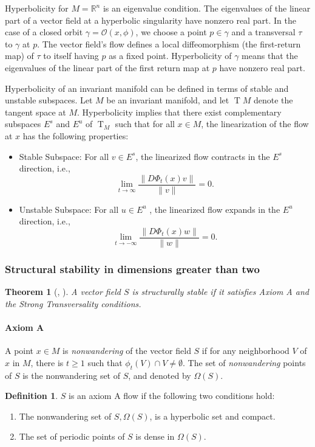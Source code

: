 \documentclass{article}
\newtheorem{theorem}{Theorem}
\theoremstyle{definition} \newtheorem{definition}{Definition}
\theoremstyle{remark} \newtheorem{remark}{Remark}
\newcommand{\reals}{\mathbb{R}}
\newcommand{\T}{\operatorname{T}}
\newcommand{\TM}{\T\!M}
\newcounter{ct}
\begin{document}
Hyperbolicity for $M=\reals^n$ is an eigenvalue condition.
The eigenvalues of the linear part of a vector field at a hyperbolic singularity have nonzero real part.
In the case of a closed orbit $\gamma=\mathcal{O}(x,\phi)$, we choose a point $p\in\gamma$ and a transversal $\tau$ to $\gamma$ at $p$.
The vector field's flow defines a local diffeomorphism (the first-return map) of $\tau$ to itself having $p$ as a fixed point.
Hyperbolicity of $\gamma$ means that the eigenvalues of the linear part of the first return map at $p$ have nonzero real part.
   
Hyperbolicity of an invariant manifold can be defined in terms of stable and unstable subspaces. Let $M$ be an invariant manifold, and let $\TM$  denote the tangent space at $M$. Hyperbolicity implies that there exist complementary subspaces $E^s$  and $E^u$  of $\T_M$  such that for all $x\in M$, the linearization of the flow at $x$ has the following properties:
\begin{itemize}
\item Stable Subspace: For all $v\in E^s$, the linearized flow contracts in the $E^s$  direction, i.e., \[\lim_{t \to \infty} \frac{\|D\Phi_t(x)v\|}{\|v\|} = 0.\]
\item Unstable Subspace: For all $u\in E^u$ , the linearized flow expands in the $E^u$ direction, i.e., \[\lim_{t \to -\infty} \frac{\|D\Phi_t(x)w\|}{\|w\|} = 0.\]
\end{itemize}


\subsubsection{Structural stability in dimensions greater than two}
\begin{theorem}[\cite{robbin1971ss}, \cite{robinson1974ss}]\label{theorem:ss}
A vector field $S$ is structurally stable if it satisfies Axiom A and the Strong Transversality conditions.
\end{theorem}

\paragraph{Axiom A}
A point $x\in M$ is \emph{nonwandering} of the vector field $S$ if for any neighborhood $V$ of $x$ in $M$, there is $t\geq 1$ such that $\phi_t(V) \cap V\neq \emptyset$. The set of \emph{nonwandering} points of $S$ is the nonwandering set of $S$, and denoted by $\Omega(S)$. 

\begin{definition}
$S$ is an axiom A flow if the following two conditions hold:
\begin{enumerate}
\item The nonwandering set of $S, \Omega(S)$, is a hyperbolic set and compact.
\item The set of periodic points of $S$ is dense in $\Omega(S)$.
\end{enumerate}
\end{definition}
\end{document}
